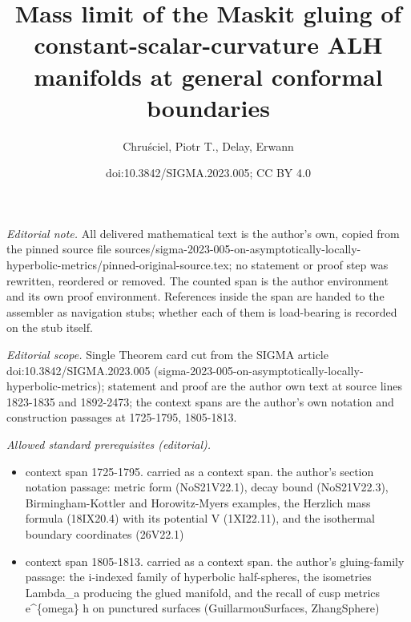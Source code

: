 \documentclass[10pt,a4paper]{article}
\title{Mass limit of the Maskit gluing of constant-scalar-curvature ALH manifolds at general conformal boundaries}
\author{Chruściel, Piotr T., Delay, Erwann}
\date{doi:10.3842/SIGMA.2023.005; CC BY 4.0}
\numberwithin{equation}{section}
\begin{document}
\maketitle
\setcounter{section}{2}
\setcounter{subsection}{0}
\setcounter{Theorem}{0}
\setcounter{equation}{0}
\noindent\textit{Editorial note.} All delivered mathematical text is the author's own, copied from the pinned source file sources/sigma-2023-005-on-asymptotically-locally-hyperbolic-metrics/pinned-original-source.tex; no statement or proof step was rewritten, reordered or removed. The counted span is the author environment and its own proof environment. References inside the span are handed to the assembler as navigation stubs; whether each of them is load-bearing is recorded on the stub itself.\par\medskip
\noindent\textit{Editorial scope.} Single Theorem card cut from the SIGMA article doi:10.3842/SIGMA.2023.005 (sigma-2023-005-on-asymptotically-locally-hyperbolic-metrics); statement and proof are the author own text at source lines 1823-1835 and 1892-2473; the context spans are the author's own notation and construction passages at 1725-1795, 1805-1813.\par\medskip
\noindent\textit{Allowed standard prerequisites (editorial).}\begin{itemize}
\item context span 1725-1795. carried as a context span. the author's section notation passage: metric form (NoS21V22.1), decay bound (NoS21V22.3), Birmingham-Kottler and Horowitz-Myers examples, the Herzlich mass formula (18IX20.4) with its potential V (1XI22.11), and the isothermal boundary coordinates (26V22.1)
\item context span 1805-1813. carried as a context span. the author's gluing-family passage: the i-indexed family of hyperbolic half-spheres, the isometries Lambda\_a producing the glued manifold, and the recall of cusp metrics e\textasciicircum{}\{omega\} h on punctured surfaces (GuillarmouSurfaces, ZhangSphere)
\end{itemize}\medskip
\end{document}
